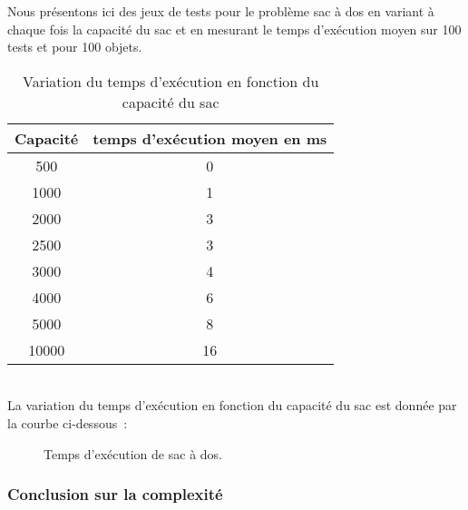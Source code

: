 Nous présentons ici des jeux de tests pour le problème sac à dos en variant à chaque fois la capacité du sac et en mesurant le temps d'exécution moyen sur 100 tests et pour 100 objets.
\begin{table}[h!]
\centering
\begin{tabular}{|c|c|}
\hline
Capacité & temps d'exécution moyen en ms\\
\hline
500 & 0\\
\hline
1000 & 1\\
\hline
2000 & 3\\
\hline
2500 & 3\\
\hline
3000 & 4\\
\hline
4000 & 6\\
\hline
5000 & 8\\
\hline
10000 & 16\\
\hline
\end{tabular}
\caption {Variation du temps d'exécution en fonction du capacité du sac}
\end{table}\\
La variation du temps d'exécution en fonction du capacité du sac est donnée par la courbe ci-dessous~:
\begin{figure}[h!]
\centering
{}
\caption{Temps d'exécution de sac à dos.}
\end{figure}

\subsubsection{Conclusion sur la complexité}
